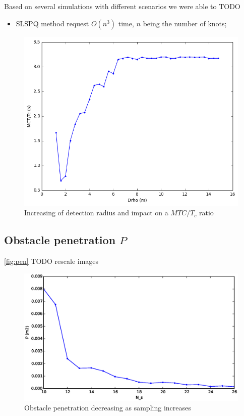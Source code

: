 \documentclass[eprint]{actapoly}
\begin{document}
Based on several simulations with different scenarios we were able to TODO

\begin{itemize}
 \item 
 SLSPQ method request $O(n^3)$ time, $n$ being the number of knots; 
\end{itemize}

\begin{figure}[!h]\centering
  \includegraphics[width=\linewidth]{./images/drho/drho-rmp.png} %
  \caption{Increasing of detection radius and impact on a $MTC/T_c$ ratio\label{fig:drho}}
\label{fig:res}
\end{figure}

\subsection{Obstacle penetration $P$}

\ref{fig:pen}
TODO rescale images

\begin{figure}[!h]\centering
  \includegraphics[width=\linewidth]{./images/penetration/pen-nsi.eps} %
  \caption{Obstacle penetration decreasing as sampling increases\label{fig:pen}}
\label{fig:res}
\end{figure}
\end{document}
